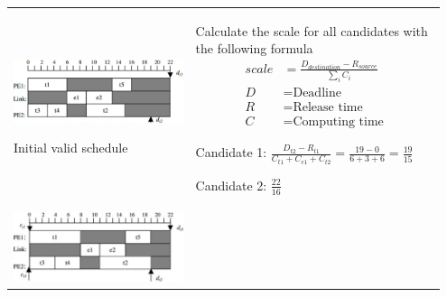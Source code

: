 \begin{longtable}{p{0.4\linewidth}p{0.55\linewidth}}
			\includegraphics[scale=0.26]{./pictures/voltage_scheduling_1.png}
			
			Initial valid schedule
			& 		
				\begin{compactenum}
					\setcounter{enumi}{1}
					\item Calculate the scale for all candidates with the following formula
					\begin{equation*}
						\begin{aligned}
							scale&=\frac{D_{destination}-R_{source}}{\sum_{i}C_i} \\
							D &= \text{Deadline} \\
							R &= \text{Release time} \\
							C &= \text{Computing time}
						\end{aligned}
					\end{equation*}
					\begin{compactitem}
						\item Candidate 1: $\frac{D_{t2}-R_{t1}}{C_{t1}+C_{e1}+C_{t2}}=\frac{19-0}{6+3+6}=\frac{19}{15}$
						\item Candidate 2: $\frac{22}{16}$
					\end{compactitem}
				\end{compactenum}\\
				
			\vspace{0pt}
			
			\includegraphics[scale=0.35]{./pictures/voltage_scheduling_2.png}
			

\end{longtable}
